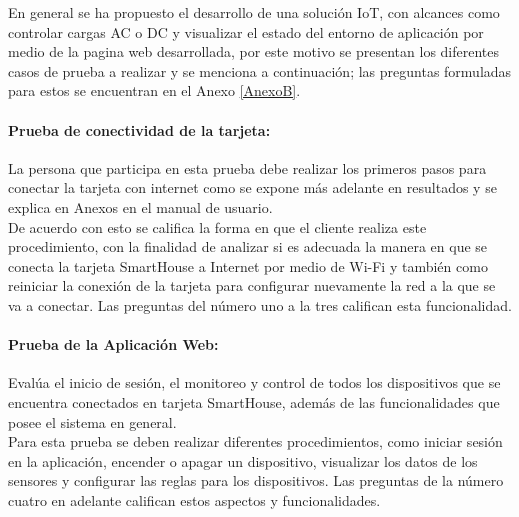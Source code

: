 En general se ha propuesto el desarrollo de una solución IoT, con alcances como controlar cargas AC o DC y visualizar el estado del entorno de aplicación por medio de la pagina web desarrollada, por este motivo se presentan los diferentes casos de prueba a realizar y se menciona a continuación; las preguntas formuladas para estos se encuentran en el Anexo \ref{AnexoB}.

\paragraph{Prueba de conectividad de la tarjeta:} La persona que participa en esta prueba debe realizar los primeros pasos para conectar la tarjeta con internet como se expone más adelante en resultados y se explica en Anexos en el manual de usuario.\\

De acuerdo con esto se califica la forma en que el cliente realiza este procedimiento, con la finalidad de analizar si es adecuada la manera en que se conecta la tarjeta SmartHouse a Internet por medio de Wi-Fi y también como reiniciar la conexión de la tarjeta para configurar nuevamente la red a la que se va a conectar. Las preguntas del número uno a la tres califican esta funcionalidad.\\

\paragraph{Prueba de la Aplicación Web:} Evalúa el inicio de sesión, el monitoreo y control de todos los dispositivos que se encuentra conectados en tarjeta SmartHouse, además de las funcionalidades que posee el sistema en general.\\

Para esta prueba se deben realizar diferentes procedimientos, como iniciar sesión en la aplicación, encender o apagar un dispositivo, visualizar los datos de los sensores y configurar las reglas para los dispositivos. Las preguntas de la número cuatro en adelante califican estos aspectos y funcionalidades.\\